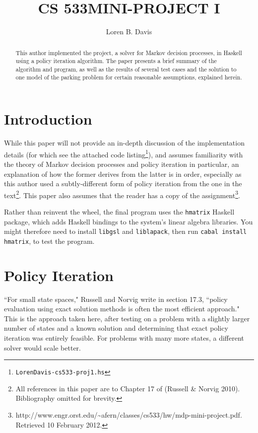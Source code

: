 \documentclass[paper=letter,pagesize=automedia,twoside=false,12pt]{scrartcl}
\title{\MakeUppercase{CS 533\quad{}Mini-Project I}}
\author{Loren B. Davis}
\theoremstyle{plain}%
\theoremstyle{definition}
\theoremstyle{remark}
\begin{document}
\maketitle
\begin{abstract}
This author implemented the project, a solver for Markov decision processes, in Haskell using a policy iteration algorithm.  The paper presents a brief summary of the algorithm and program, as well as the results of several test cases and the solution to one model of the parking problem for certain reasonable assumptions, explained herein.
\end{abstract}

\section{Introduction}\label{sec:intro}
While this paper will not provide an in-depth discussion of the implementation details (for which see the attached code listing\footnote{\texttt{LorenDavis-cs533-proj1.hs}}), and assumes familiarity with the theory of Markov decision processes and policy iteration in particular, an explanation of how the former derives from the latter is in order, especially as this author used a subtly-different form of policy iteration from the one in the text\footnote{All references in this paper are to Chapter 17 of (Russell \& Norvig 2010).  Bibliography omitted for brevity.}.  This paper also assumes that the reader has a copy of the assignment\footnote{http://www.engr.orst.edu/\textasciitilde{}afern/classes/cs533/hw/mdp-mini-project.pdf.  Retrieved 10 February 2012.}.

Rather than reinvent the wheel, the final program uses the \texttt{hmatrix} Haskell package, which adds Haskell bindings to the system's linear algebra libraries.  You might therefore need to install \texttt{libgsl} and \texttt{liblapack}, then run \texttt{cabal install hmatrix}, to test the program.

\section{Policy Iteration}\label{sec:exact-pi}

``For small state spaces," Russell and Norvig write in section 17.3, ``policy evaluation using exact solution methods is often the most efficient approach."  This is the approach taken here, after testing on a problem with a slightly larger number of states and a known solution and determining that exact policy iteration was entirely feasible.  For problems with many more states, a different solver would scale better.
\end{document}
